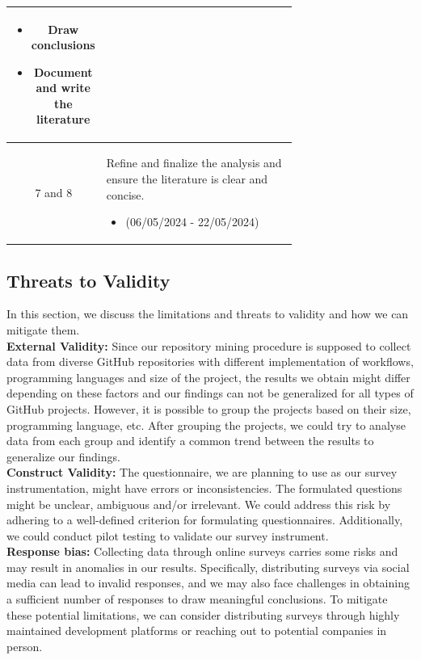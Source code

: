 \documentclass[conference]{IEEEtran}
\begin{document}
\begin{table}[h]
\begin{tabular}{|c|p{0.7\linewidth}|}
\begin{itemize}
                \item Draw conclusions
                \item Document and write the literature
            \end{itemize} \\ \hline
            7 and 8   & Refine and finalize the analysis and ensure the literature is clear and concise. 
	  \begin{itemize}
                \item(06/05/2024 - 22/05/2024)
            \end{itemize} \\ \hline
            \end{tabular}
        \end{table}

    \subsection{Threats to Validity}
        In this section, we discuss the limitations and threats to
        validity and how we can mitigate them.\\

        \textbf{External Validity:} Since our repository mining procedure is supposed to collect data from diverse GitHub repositories with different implementation of workflows, programming languages and size of the project, the results we obtain might differ depending on these factors and our findings can not be generalized for all types of GitHub projects. However, it is possible to group the projects based on their size, programming language, etc. After grouping the projects, we could try to analyse data from each group and identify a common trend between the results to generalize our findings.\\

	\textbf{Construct Validity:} The questionnaire, we are planning to use as our survey instrumentation, might have errors or inconsistencies. The formulated questions might be unclear, ambiguous and/or irrelevant. We could address this risk by adhering to a well-defined criterion for formulating questionnaires. Additionally, we could conduct pilot testing to validate our survey instrument.\\

        \textbf{Response bias:} Collecting data through online surveys carries some risks and may result in anomalies in our results. Specifically, distributing surveys via social media can lead to invalid responses, and we may also face challenges in obtaining a sufficient number of responses to draw meaningful conclusions. To mitigate these potential limitations, we can consider distributing surveys through highly maintained development platforms or reaching out to potential companies in person. 
\end{document}
